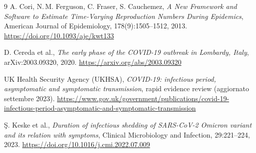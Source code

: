 \documentclass[12pt, a4paper]{article}
\begin{document}
\begin{thebibliography}{9}
A. Cori, N.\,M. Ferguson, C. Fraser, S. Cauchemez,
\textit{A New Framework and Software to Estimate Time-Varying Reproduction Numbers
During Epidemics},
American Journal of Epidemiology, 178(9):1505--1512, 2013.
\url{https://doi.org/10.1093/aje/kwt133}

D. Cereda et al.,
\textit{The early phase of the COVID-19 outbreak in Lombardy, Italy},
arXiv:2003.09320, 2020.
\url{https://arxiv.org/abs/2003.09320}

UK Health Security Agency (UKHSA),
\textit{COVID-19: infectious period, asymptomatic and symptomatic transmission},
rapid evidence review (aggiornato settembre 2023).
\url{https://www.gov.uk/government/publications/covid-19-infectious-period-asymptomatic-and-symptomatic-transmission}

\c{S}. Keske et al.,
\textit{Duration of infectious shedding of SARS-CoV-2 Omicron variant and its relation
with symptoms},
Clinical Microbiology and Infection, 29:221--224, 2023.
\url{https://doi.org/10.1016/j.cmi.2022.07.009}

\end{thebibliography}
\end{document}
